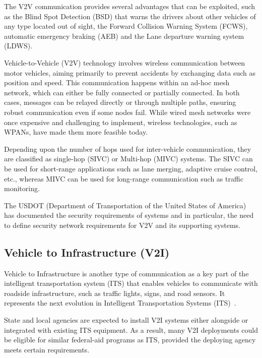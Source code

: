 The V2V communication provides several advantages that can be exploited, such as the Blind Spot Detection (BSD) that warns the drivers about other vehicles of any type located out of sight,
the Forward Collision Warning System (FCWS), automatic emergency braking (AEB) and the Lane departure warning system (LDWS)\cite{arena2019overview}.

Vehicle-to-Vehicle (V2V) technology involves wireless communication between motor vehicles, aiming primarily to prevent accidents by exchanging data such as position and speed.
This communication happens within an ad-hoc mesh network, which can either be fully connected or partially connected.
In both cases, messages can be relayed directly or through multiple paths, ensuring robust communication even if some nodes fail.
While wired mesh networks were once expensive and challenging to implement, wireless technologies, such as WPANs, have made them more feasible today\cite{arena2019overview}.

Depending upon the number of hops used for inter-vehicle communication, they are classified as single-hop (SIVC) or
Multi-hop (MIVC) systems.
The SIVC can be used for short-range applications such as
lane merging, adaptive cruise control, etc., whereas MIVC can be used for long-range communication such as traffic monitoring\cite{zheng2020cooperative}.

The USDOT (Department of Transportation of the United States of America) has documented the security requirements of
systems and in particular, the need to define security network requirements for V2V and its supporting systems.

\subsection{Vehicle to Infrastructure (V2I)}\label{subsec:vehicle-to-infrastructure-(v2i)}
Vehicle to Infrastructure is another type of communication as a key part of the intelligent transportation system (ITS)
that enables vehicles to communicate with roadside infrastructure, such as traffic lights, signs, and road sensors.
It represents the next evolution in Intelligent Transportation Systems (ITS)~\cite{dot2024v2i}.

State and local agencies are expected to install V2I systems either alongside or integrated with existing ITS equipment.
As a result, many V2I deployments could be eligible for similar federal-aid programs as ITS,
provided the deploying agency meets certain requirements\cite{dot2024v2i}.

